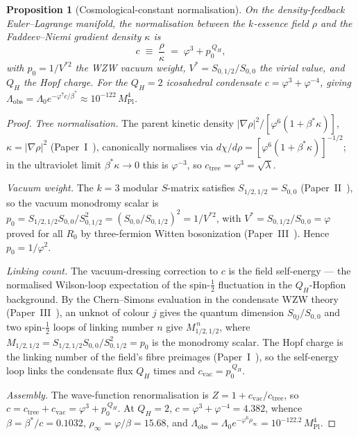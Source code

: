 \documentclass[11pt,a4paper]{article}
\newtheorem{proposition}[theorem]{Proposition}
\theoremstyle{definition}
\theoremstyle{remark}
\newcommand{\vp}{\varphi}
\newcommand{\bst}{\beta^{*}}
\newcommand{\lam}{\lambda}
\newcommand{\MPl}{M_{\mathrm{Pl}}}
\newcommand{\Lobs}{\Lambda_{\mathrm{obs}}}
\newcommand{\rinfty}{\rho_{\infty}}
\begin{document}
\begin{proposition}[Cosmological-constant normalisation]
\label{P7:prop:cc_norm}
On the density-feedback Euler--Lagrange manifold, the normalisation
between the $k$-essence field $\rho$ and the Faddeev--Niemi gradient
density $\kappa$ is
\begin{equation}
  c \;\equiv\; \frac{\rho}{\kappa} \;=\; \vp^3 + p_0^{\,Q_H},
  \label{P7:eq:cc_norm}
\end{equation}
with $p_0 = 1/V^{*2}$ the WZW vacuum weight, $V^* = S_{0,1/2}/S_{0,0}$ the
virial value, and $Q_H$ the Hopf charge.  For the $Q_H=2$ icosahedral
condensate $c = \vp^3 + \vp^{-4}$, giving
$\Lobs = \Lambda_0 e^{-\vp^7 c/\bst}\approx10^{-122}\,\MPl^4$.
\end{proposition}

\begin{proof}
\emph{Tree normalisation.} The parent kinetic density
$|\nabla\rho|^2/[\vp^6(1+\bst\kappa)]$, $\kappa=|\nabla\rho|^2$
(Paper~I~\cite{Paper1}), canonically normalises via
$d\chi/d\rho=[\vp^6(1+\bst\kappa)]^{-1/2}$; in the ultraviolet limit
$\bst\kappa\to0$ this is $\vp^{-3}$, so $c_{\mathrm{tree}}=\vp^3=\sqrt{\lam}$.

\emph{Vacuum weight.} The $k=3$ modular $S$-matrix satisfies
$S_{1/2,1/2}=S_{0,0}$ (Paper~II~\cite{Paper2}), so the vacuum monodromy
scalar is $p_0=S_{1/2,1/2}S_{0,0}/S_{0,1/2}^2=(S_{0,0}/S_{0,1/2})^2=1/V^{*2}$,
with $V^*=S_{0,1/2}/S_{0,0}=\vp$ proved for all $R_0$ by three-fermion
Witten bosonization (Paper~III~\cite{Paper3}).  Hence $p_0=1/\vp^2$.

\emph{Linking count.} The vacuum-dressing correction to $c$ is the field
self-energy --- the normalised Wilson-loop expectation of the
spin-$\tfrac12$ fluctuation in the $Q_H$-Hopfion background.  By the
Chern--Simons evaluation in the condensate WZW theory
(Paper~III~\cite{Paper3}), an unknot of colour $j$ gives the quantum
dimension $S_{0j}/S_{0,0}$ and two spin-$\tfrac12$ loops of linking number
$n$ give $M_{1/2,1/2}^{\,n}$, where
$M_{1/2,1/2}=S_{1/2,1/2}S_{0,0}/S_{0,1/2}^2=p_0$ is the monodromy scalar.
The Hopf charge is the linking number of the field's fibre preimages
(Paper~I~\cite{Paper1}), so the self-energy loop links the condensate flux
$Q_H$ times and $c_{\mathrm{vac}}=p_0^{\,Q_H}$.

\emph{Assembly.} The wave-function renormalisation is
$Z=1+c_{\mathrm{vac}}/c_{\mathrm{tree}}$, so
$c=c_{\mathrm{tree}}+c_{\mathrm{vac}}=\vp^3+p_0^{\,Q_H}$.  At $Q_H=2$,
$c=\vp^3+\vp^{-4}=4.382$, whence $\beta=\bst/c=0.1032$,
$\rinfty=\vp/\beta=15.68$, and
$\Lobs=\Lambda_0 e^{-\vp^6\rinfty}=10^{-122.2}\,\MPl^4$.
\end{proof}
\end{document}

